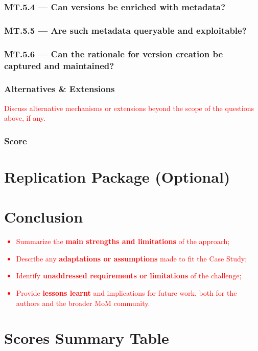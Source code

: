 \documentclass[sigconf,review]{acmart}
\begin{document}


\subsubsection*{MT.5.4 --- Can versions be enriched with metadata?}
\label{sec:MT5-4}



\subsubsection*{MT.5.5 --- Are such metadata queryable and exploitable?}
\label{sec:MT5-5}



\subsubsection*{MT.5.6 --- Can the rationale for version creation be captured and maintained?}
\label{sec:MT5-6}



\subsubsection*{Alternatives \& Extensions}
\label{sec:MT5-Alternatives-Extensions}

\textcolor{red}{Discuss alternative mechanisms or extensions beyond the 
scope of the questions above, if any.}

\subsubsection*{Score}
\label{sec:MT5-Score}


\section{Replication Package (Optional)}
\label{sec:RP}

\section{Conclusion}
\label{sec:Conclusion}

\textcolor{red}{
\begin{itemize}
   \item Summarize the \textbf{main strengths and limitations} of the approach;
   \item Describe any \textbf{adaptations or assumptions} made to fit the Case Study;
   \item Identify \textbf{unaddressed requirements or limitations} of the challenge;
   \item Provide \textbf{lessons learnt} and implications for future work,
   both for the authors and the broader MoM community.
\end{itemize}
}




\appendix
\section{Scores Summary Table}
\label{app:Scores}

\MTSummaryTable
\end{document}
